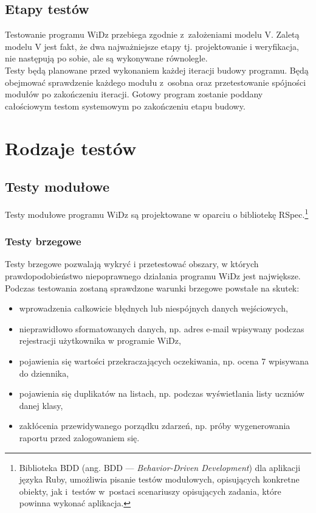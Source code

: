 \documentclass[12pt,leqno,twoside]{mwart}
\begin{document}
\subsection{Etapy testów}
\noindent Testowanie programu WiDz przebiega zgodnie z~założeniami modelu V. Zaletą modelu V jest fakt, że dwa najważniejsze etapy tj. projektowanie i weryfikacja, nie następują po sobie, ale są wykonywane równolegle. \\
\indent Testy będą planowane przed wykonaniem każdej iteracji budowy programu. Będą obejmować sprawdzenie każdego modułu z~osobna oraz przetestowanie spójności modułów po zakończeniu iteracji. Gotowy program zostanie poddany całościowym testom systemowym po zakończeniu etapu budowy.

\section{Rodzaje testów}
\subsection{Testy modułowe}
\noindent Testy modułowe programu WiDz są projektowane w oparciu o bibliotekę RSpec.\footnote{Biblioteka BDD (ang. BDD --- \textit{Behavior-Driven Development}) dla aplikacji języka Ruby, umożliwia pisanie testów modułowych, opisujących konkretne obiekty, jak i~testów w~postaci scenariuszy opisujących zadania, które powinna wykonać aplikacja.} \\

\subsubsection{Testy brzegowe}
\noindent Testy brzegowe pozwalają wykryć i przetestować obszary, w których prawdopodobieństwo niepoprawnego działania programu WiDz jest największe. Podczas testowania zostaną sprawdzone warunki brzegowe powstałe na skutek: 
\begin{itemize}
	\item wprowadzenia całkowicie błędnych lub niespójnych danych wejściowych, 
	\item nieprawidłowo sformatowanych danych, np. adres e-mail wpisywany podczas rejestracji użytkownika w programie WiDz,
	\item pojawienia się wartości przekraczających oczekiwania, np. ocena 7 wpisywana do dziennika,
	\item pojawienia się duplikatów na listach, np. podczas wyświetlania listy uczniów danej klasy,
	\item zakłócenia przewidywanego porządku zdarzeń, np. próby wygenerowania raportu przed zalogowaniem się.
\end{itemize} 
\end{document}
